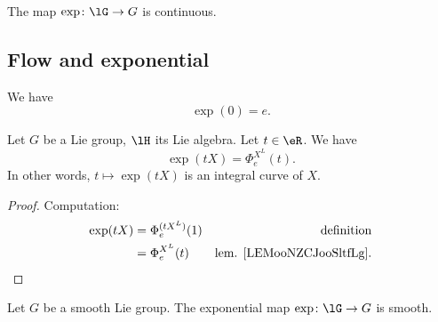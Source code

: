 \begin{proposition}     \label{PROPooMAGKooInwNom}
	The map \( \exp\colon \lG\to G\) is continuous.
\end{proposition}

\subsection{Flow and exponential}

\begin{lemma}       \label{LEMooEQFHooRjUAin}
	We have
	\begin{equation}
		\exp(0)=e.
	\end{equation}
\end{lemma}


\begin{lemma}        \label{LEMooGKDKooFTsDSr}
	Let \( G\) be a Lie group, \( \lH\) its Lie algebra. Let \( t\in \eR\). We have
	\begin{equation}
		\exp(tX)=\Phi_e^{X^L}(t).
	\end{equation}
	In other words, \( t\mapsto \exp(tX)\) is an integral curve of \( X\).
\end{lemma}

\begin{proof}
	Computation:
	\begin{subequations}
		\begin{align}
			\exp(tX) & =\Phi_e^{(tX^L)}(1) & \text{definition}                    \\
			         & =\Phi_e^{X^L}(t)    & \text{lem. \ref{LEMooNZCJooSltfLg}}.
		\end{align}
	\end{subequations}
\end{proof}

\begin{proposition}       \label{PROPooMIMZooAwxvkB}
	Let \( G\) be a smooth Lie group. The exponential map \( \exp\colon \lG\to G\) is smooth.
\end{proposition}

